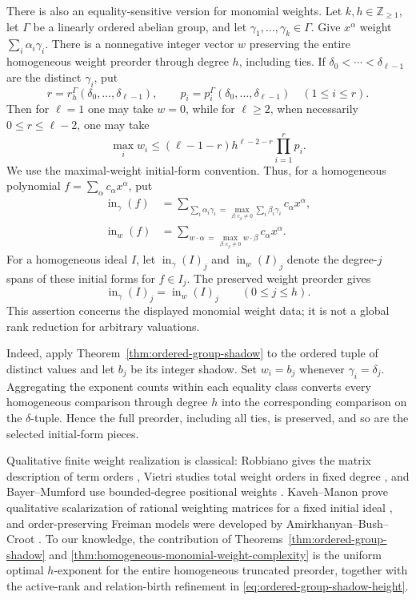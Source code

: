 \documentclass[11pt,reqno]{amsart}
\theoremstyle{definition}
\theoremstyle{remark}
\begin{document}
There is also an equality-sensitive version for monomial weights.  Let
$k,h\in\mathbb Z_{\geq1}$, let $\Gamma$ be a linearly ordered abelian group,
and let $\gamma_1,\ldots,\gamma_k\in\Gamma$.  Give
$x^\alpha$ weight $\sum_i\alpha_i\gamma_i$.  There is a
nonnegative integer vector $w$ preserving the entire homogeneous weight
preorder through degree $h$, including ties.  If
$\delta_0<\cdots<\delta_{\ell-1}$ are the distinct $\gamma_i$, put
\[
 r=r_h^\Gamma(\delta_0,\ldots,\delta_{\ell-1}),\qquad
 p_i=p_i^\Gamma(\delta_0,\ldots,\delta_{\ell-1})
 \quad(1\leq i\leq r).
\]
Then for $\ell=1$ one may take
$w=0$, while for $\ell\geq2$, when necessarily $0\leq r\leq\ell-2$, one may take
\begin{equation}\label{eq:monomial-gamma-shadow}
 \max_iw_i\leq
 (\ell-1-r)h^{\ell-2-r}\prod_{i=1}^r p_i.
\end{equation}
We use the maximal-weight initial-form convention.  Thus, for a homogeneous
polynomial $f=\sum_\alpha c_\alpha x^\alpha$, put
\[
 \begin{aligned}
 \operatorname{in}_\gamma(f)
 &=\sum_{\sum_i\alpha_i\gamma_i\,=\,
          \max_{\beta:c_\beta\ne0}\sum_i\beta_i\gamma_i}
          c_\alpha x^\alpha,\\
 \operatorname{in}_w(f)
 &=\sum_{w\cdot\alpha\,=\,\max_{\beta:c_\beta\ne0}w\cdot\beta}
          c_\alpha x^\alpha.
 \end{aligned}
\]
For a homogeneous ideal $I$, let
$\operatorname{in}_\gamma(I)_j$ and $\operatorname{in}_w(I)_j$ denote the
degree-$j$ spans of these initial forms for $f\in I_j$.  The preserved weight
preorder gives
\[
 \operatorname{in}_\gamma(I)_j=\operatorname{in}_w(I)_j
 \qquad(0\leq j\leq h).
\]
This assertion concerns the displayed monomial weight data; it is not a
global rank reduction for arbitrary valuations.

Indeed, apply Theorem~\ref{thm:ordered-group-shadow} to the ordered tuple of
distinct values and let $b_j$ be its integer shadow.  Set $w_i=b_j$ whenever
$\gamma_i=\delta_j$.  Aggregating the exponent counts within each equality
class converts every homogeneous comparison through degree $h$ into the
corresponding comparison on the $\delta$-tuple.  Hence the full preorder,
including all ties, is preserved, and so are the selected initial-form pieces.

Qualitative finite weight realization is classical: Robbiano gives the
matrix description of term orders \cite{Robbiano1985}, Vietri studies total
weight orders in fixed degree \cite{Vietri2002}, and Bayer--Mumford use
bounded-degree positional weights \cite{BayerMumford1993}.  Kaveh--Manon
prove qualitative scalarization of rational weighting matrices for a fixed
initial ideal \cite[Appendix Lemma~8.9 and Proposition~8.10]{KavehManon2019},
and order-preserving Freiman models were developed by
Amirkhanyan--Bush--Croot \cite{AmirkhanyanBushCroot2018}.  To our knowledge,
the contribution
of Theorems~\ref{thm:ordered-group-shadow} and
\ref{thm:homogeneous-monomial-weight-complexity} is the uniform optimal
$h$-exponent for the entire homogeneous truncated preorder, together with
the active-rank and relation-birth refinement in
\eqref{eq:ordered-group-shadow-height}.
\end{document}
